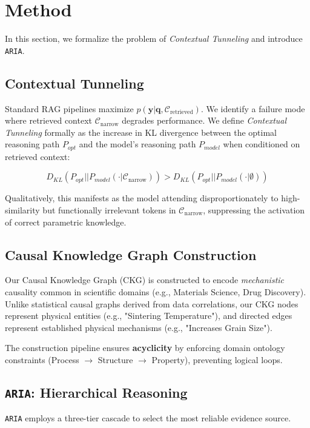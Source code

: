 \section{Method}

In this section, we formalize the problem of \textit{Contextual Tunneling} and introduce \texttt{ARIA}.

\subsection{Contextual Tunneling}
\label{sec:contextual tunneling}
Standard RAG pipelines maximize $p(\mathbf{y}|\mathbf{q},\mathcal{C}_{\text{retrieved}})$. We identify a failure mode where retrieved context $\mathcal{C}_{\text{narrow}}$ degrades performance. We define \textit{Contextual Tunneling} formally as the increase in KL divergence between the optimal reasoning path $P_{opt}$ and the model's reasoning path $P_{model}$ when conditioned on retrieved context:

\begin{equation}
 D_{KL}(P_{opt} || P_{model}(\cdot | \mathcal{C}_{\text{narrow}})) > D_{KL}(P_{opt} || P_{model}(\cdot | \emptyset))
\end{equation}

Qualitatively, this manifests as the model attending disproportionately to high-similarity but functionally irrelevant tokens in $\mathcal{C}_{\text{narrow}}$, suppressing the activation of correct parametric knowledge.

\subsection{Causal Knowledge Graph Construction}
\label{sec:causal graph}
Our Causal Knowledge Graph (CKG) is constructed to encode \textit{mechanistic} causality common in scientific domains (e.g., Materials Science, Drug Discovery). Unlike statistical causal graphs derived from data correlations, our CKG nodes represent physical entities (e.g., "Sintering Temperature"), and directed edges represent established physical mechanisms (e.g., "Increases Grain Size").

The construction pipeline ensures \textbf{acyclicity} by enforcing domain ontology constraints (Process $\to$ Structure $\to$ Property), preventing logical loops.

\subsection{\texttt{ARIA}: Hierarchical Reasoning}
\label{sec:aria}
\texttt{ARIA} employs a three-tier cascade to select the most reliable evidence source.

